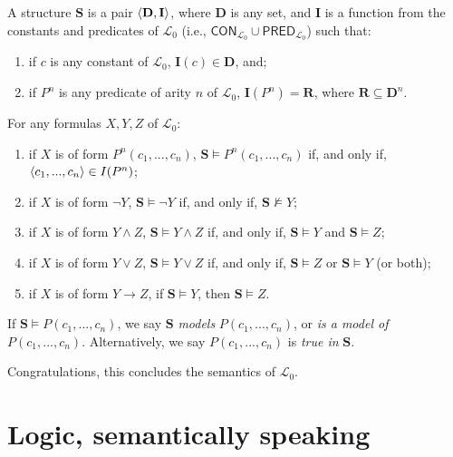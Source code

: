 \begin{defn} \label{models}
	A structure $\mathbf{S}$ is a pair $\langle\mathbf{D}, \mathbf{I}\rangle$, where $\mathbf{D}$ is any set, and $\mathbf{I}$ is a function from the constants and predicates of $\mathcal{L}_0$ (i.e., $\mathsf{CON}_{\mathcal{L}_0} \cup \mathsf{PRED}_{\mathcal{L}_0}$) such that:
	\begin{enumerate}
		\item if $c$ is any constant of $\mathcal{L}_0$, $\mathbf{I}(c) \in \mathbf{D}$, and;
		\item if $P^n$ is any predicate  of arity $n$ of $\mathcal{L}_0$, $\mathbf{I}(P^n)=\mathbf{R}$, where $\mathbf{R} \subseteq \mathbf{D}^n$. 
	\end{enumerate}
	For any formulas $X, Y, Z$ of $\mathcal{L}_0$:
	
	\begin{enumerate}
	\item if $X$ is of form $P^n(c_1, ..., c_n)$, $\mathbf{S} \models P^n(c_1, ..., c_n)$ if, and only if, $\langle c_1, ..., c_n\rangle \in I(P^n)$;
	\item if $X$ is of form $\neg Y$, $\mathbf{S} \models \neg Y$ if, and only if, $\mathbf{S} \not\models Y$;
	\item if $X$ is of form $Y \wedge Z$, $\mathbf{S} \models Y \wedge Z$ if, and only if, $\mathbf{S} \models Y$ and $\mathbf{S}\models Z$;
	\item if $X$ is of form $Y \vee Z$,  $\mathbf{S} \models Y \vee Z$ if, and only if, $\mathbf{S} \models Z$ or $\mathbf{S}\models Y$ (or both);
	\item if $X$ is of form $Y \rightarrow Z$, if $\mathbf{S} \models Y$, then $\mathbf{S} \models Z$. 
	\end{enumerate}
	
	If $\mathbf{S} \models P(c_1, ..., c_n)$, we say $\mathbf{S}$ \textit{models} $P(c_1, ..., c_n)$, or \textit{is a model of} $P(c_1, ..., c_n)$. Alternatively, we say $P(c_1, ..., c_n)$ is \textit{true in} $\mathbf{S}$.
\end{defn}

Congratulations, this concludes the semantics of $\mathcal{L}_0$.

\section{Logic, semantically speaking}